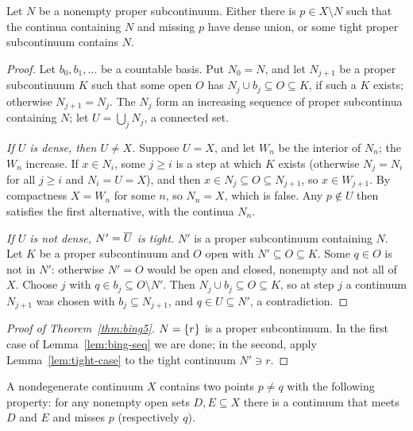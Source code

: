 \begin{lemma}\label{lem:bing-seq}
Let $N$ be a nonempty proper subcontinuum. Either there is $p\in X\setminus N$ such that the continua containing $N$ and
missing $p$ have dense union, or some tight proper subcontinuum contains $N$.
\end{lemma}

\begin{proof}
Let $b_0,b_1,\dots$ be a countable basis. Put $N_0=N$, and let $N_{j+1}$ be a proper subcontinuum $K$ such that some
open $O$ has $N_j\cup b_j\subseteq O\subseteq K$, if such a $K$ exists; otherwise $N_{j+1}=N_j$. The $N_j$ form an increasing
sequence of proper subcontinua containing $N$; let $U=\bigcup_jN_j$, a connected set.

\emph{If $U$ is dense, then $U\ne X$.} Suppose $U=X$, and let $W_n$ be the interior of $N_n$; the $W_n$ increase. If
$x\in N_i$, some $j\ge i$ is a step at which $K$ exists (otherwise $N_j=N_i$ for all $j\ge i$ and $N_i=U=X$), and then
$x\in N_j\subseteq O\subseteq N_{j+1}$, so $x\in W_{j+1}$. By compactness $X=W_n$ for some $n$, so $N_n=X$, which is false. Any $p\notin
U$ then satisfies the first alternative, with the continua $N_n$.

\emph{If $U$ is not dense, $N'=\overline{U}$ is tight.} $N'$ is a proper subcontinuum containing $N$. Let $K$ be a proper
subcontinuum and $O$ open with $N'\subseteq O\subseteq K$. Some $q\in O$ is not in $N'$: otherwise $N'=O$ would be open and closed,
nonempty and not all of $X$. Choose $j$ with $q\in b_j\subseteq O\setminus N'$. Then $N_j\cup b_j\subseteq O\subseteq K$, so at step $j$ a
continuum $N_{j+1}$ was chosen with $b_j\subseteq N_{j+1}$, and $q\in U\subseteq N'$, a contradiction.
\end{proof}


\begin{proof}[Proof of Theorem~\ref{thm:bing5}]
$N=\left\{ r \right\}$ is a proper subcontinuum. In the first case of Lemma~\ref{lem:bing-seq} we are done; in the second,
apply Lemma~\ref{lem:tight-case} to the tight continuum $N'\ni r$.
\end{proof}


\begin{corollary}\label{cor:bing2}
A nondegenerate continuum $X$ contains two points $p\ne q$ with the following property: for any nonempty open sets
$D,E\subseteq X$ there is a continuum that meets $D$ and $E$ and misses $p$ (respectively $q$).
\end{corollary}


